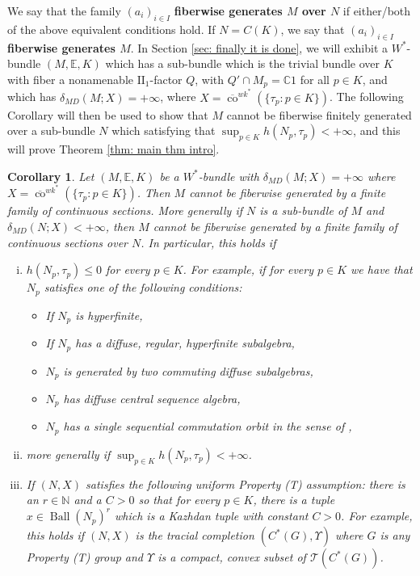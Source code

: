 \documentclass[10pt]{amsart}
\newtheorem{cor}[thm]{Corollary}
\theoremstyle{definition}
\numberwithin{equation}{section}
\newcommand{\bC}{{\mathbb C}}
\newcommand{\bE}{{\mathbb E}}
\newcommand{\bN}{{\mathbb N}}
\newcommand{\cT}{{\mathcal T}}
\DeclareMathOperator{\Ball}{Ball}
\DeclareMathOperator{\co}{co}
\begin{document}
We say that the family $(a_{i})_{i\in I}$ \textbf{fiberwise generates $M$ over $N$} if either/both of the above equivalent conditions hold. If $N=C(K)$, we say that $(a_{i})_{i\in I}$ \textbf{fiberwise generates $M$}. 
In Section \ref{sec: finally it is done}, we will exhibit a $W^{*}$-bundle $(M,\bE,K)$ which has a sub-bundle which is the trivial bundle over $K$ with fiber a nonamenable $\textrm{II}_{1}$-factor $Q$, with $Q'\cap M_{p}=\bC1$ for all $p\in K$, and which has $\delta_{MD}(M;X)=+\infty$, where $X=\overline{\co}^{wk^{*}}(\{\tau_{p}:p\in K\})$. The following Corollary will then be used to show that $M$ cannot be fiberwise finitely generated over a sub-bundle $N$ which satisfying that $\sup_{p\in K}h(N_{p},\tau_{p})<+\infty$, and this will prove Theorem \ref{thm: main thm intro}.


\begin{cor} \label{cor: better main thm}
Let $(M,\bE,K)$ be a $W^{*}$-bundle with $\delta_{MD}(M;X)=+\infty$ where $X=\overline{\co}^{wk^{*}}(\{\tau_{p}:p\in K\})$. Then $M$ cannot be fiberwise generated by a finite family of continuous sections. More generally if $N$ is a sub-bundle of $M$ and $\delta_{MD}(N;X)<+\infty$, then $M$ cannot be fiberwise generated by a finite family of continuous sections over $N$.  
In particular, this holds if 
\begin{enumerate}[(i)]
 \item $h(N_{p},\tau_{p})\leq 0$ for every $p\in K$. For example, if for every $p\in K$ we have that $N_{p}$ satisfies one of the following conditions:
\begin{itemize}
    \item If $N_{p}$ is hyperfinite,
    \item If $N_{p}$ has a diffuse, regular, hyperfinite subalgebra,
    \item $N_{p}$ is generated by two commuting diffuse subalgebras,
    \item $N_{p}$ has diffuse central sequence algebra,
    \item $N_{p}$ has a single sequential commutation orbit in the sense of  \cite{SeqCommutation},
\end{itemize}
\item \label{item: uniformly strongly 1-bounded_2}  more generally if $\sup_{p\in K}h(N_{p},\tau_{p})<+\infty$. 
\item \label{item: M property (T)_2} 
If $(N,X)$ satisfies the following uniform Property (T) assumption: there is an $r\in \bN$ and a $C>0$ so that for every $p\in K$, there is a tuple $x\in \Ball(N_{p})^{r}$ which is a Kazhdan tuple with constant $C>0$. 
For example, this holds if $(N,X)$ is the tracial completion $(C^{*}(G),\Upsilon)$ where $G$ is any Property (T) group and $\Upsilon$ is a compact, convex subset of $\cT(C^{*}(G))$.

\end{enumerate}

\end{cor}
\end{document}
